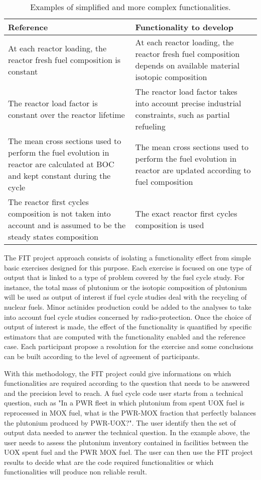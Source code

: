 \begin{table}[h]
\centering
\begin{tabular}{ |p{}|p{}| }
  \hline
  Reference & Functionality to develop \\
  \hline
  At each reactor loading, the reactor fresh fuel composition is constant & At
  each reactor loading, the reactor fresh fuel composition depends on available
  material isotopic composition \\
  \hline
  The reactor load factor is constant over the reactor lifetime & The reactor
  load factor takes into account precise industrial constraints, such as partial
  refueling \\
  \hline
  The mean cross sections used to perform the fuel evolution in reactor are
  calculated at BOC and kept constant during the cycle & The mean cross sections
  used to perform the fuel evolution in reactor are updated according to fuel
  composition \\
  \hline
  The reactor first cycles composition is not taken into account and is assumed
  to be the steady states composition & The exact reactor first cycles
  composition is used \\
  \hline
\end{tabular}
\label{Tab:Funct}
\caption{Examples of simplified and more complex functionalities.}
\end{table}

The FIT project approach consists of isolating a functionality effect from
simple basic exercises designed for this purpose. Each exercise is focused on one type of output that is linked to a type of problem covered by the fuel cycle study. For instance, the total mass of plutonium or the isotopic composition of plutonium will be used as output of interest if fuel cycle studies deal with the recycling of nuclear fuels. Minor actinides production could be added to the analyses to take into account fuel cycle studies concerned by radio-protection. Once the choice of output of interest is made, the effect of the functionality is quantified by specific estimators that are computed with the functionality enabled and the reference case. Each participant propose a resolution for the exercise and some conclusions can be built according to the level of agreement of participants.

With this methodology, the FIT project could give informations on which
functionalities are required according to the question that needs to be answered
and the precision level to reach. A fuel cycle code user starts from a technical
question, such as "In a PWR fleet in which plutonium from spent UOX fuel is
reprocessed in MOX fuel, what is the PWR-MOX fraction that perfectly balances
the plutonium produced by PWR-UOX?". The user identify then the set of output
data needed to answer the technical question. In the example above, the user
needs to assess the plutonium inventory contained in facilities between the UOX
spent fuel and the PWR MOX fuel. The user can then use the FIT project results
to decide what are the code required functionalities or which functionalities
will produce non reliable result. 

